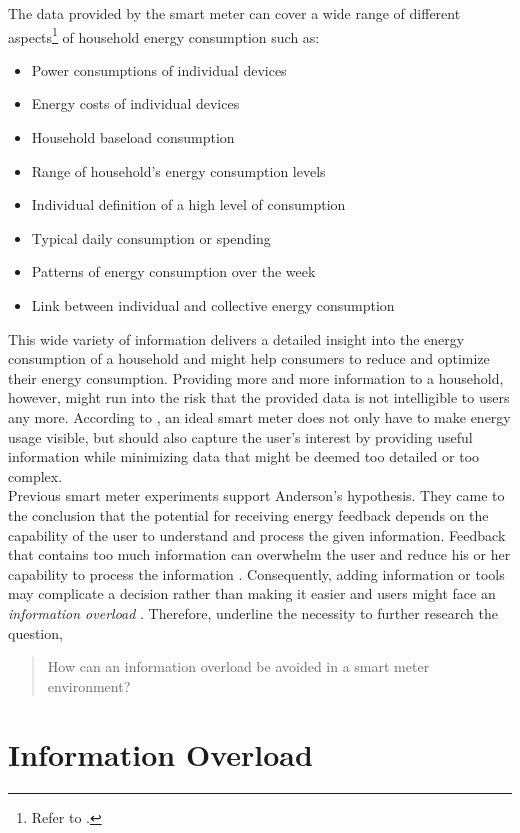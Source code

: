 The data provided by the smart meter can cover a wide range of different aspects\footnote{Refer to \citep{WillAnderson2009}.} of household energy consumption such as:
    \begin{itemize}
    \item Power consumptions of individual devices
    \item Energy costs of individual devices
    \item Household baseload consumption
    \item Range of household's energy consumption levels
    \item Individual definition of a high level of consumption
    \item Typical daily consumption or spending
    \item Patterns of energy consumption over the week
    \item Link between individual and collective energy consumption
    \end{itemize}%
This wide variety of information delivers a detailed insight into the energy consumption of a household and might help consumers to reduce and optimize their energy consumption. Providing more and more information to a household, however, might run into the risk that the provided data is not intelligible to users any more. According to \cite{WillAnderson2009}, an ideal smart meter does not only have to make energy usage visible, but should also capture the user's interest by providing useful information while minimizing data that might be deemed too detailed or too complex.\\
Previous smart meter experiments support Anderson's hypothesis. They came to the conclusion that the potential for receiving energy feedback depends on the capability of the user to understand and process the given information.
Feedback that contains too much information can overwhelm the user and reduce his or her capability to process the information \citep{Henryson2000}. Consequently,  adding information or tools may complicate a decision rather than making it easier \citep{Darby2006} and users might face an \textit{information overload} \citep{Fischer2008}. Therefore, \cite{WillAnderson2009} underline the necessity to further research the question, 
\begin{quote}
How can an information overload be avoided in a smart meter environment?
\end{quote}

\section{Information Overload}
\label{ch:Literature Review:sec:Information Overload}

